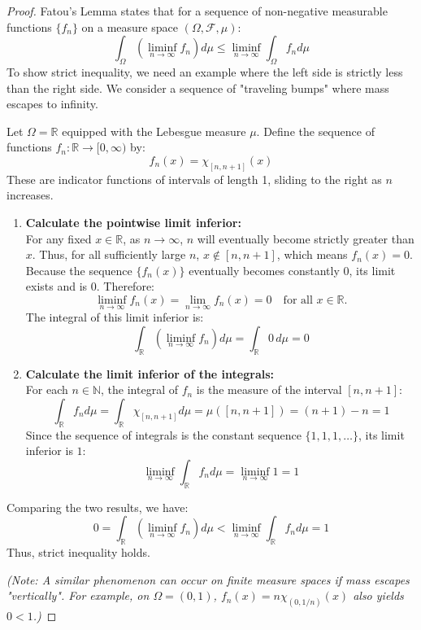 \documentclass[11pt]{article}
\begin{document}
\begin{proof}
Fatou's Lemma states that for a sequence of non-negative measurable functions $\{f_n\}$ on a measure space $(\Omega, \mathcal{F}, \mu)$:
\[ \int_\Omega \left( \liminf_{n \to \infty} f_n \right) d\mu \le \liminf_{n \to \infty} \int_\Omega f_n d\mu \]
To show strict inequality, we need an example where the left side is strictly less than the right side. We consider a sequence of "traveling bumps" where mass escapes to infinity.

Let $\Omega = \mathbb{R}$ equipped with the Lebesgue measure $\mu$. Define the sequence of functions $f_n: \mathbb{R} \to [0, \infty)$ by:
\[ f_n(x) = \chi_{[n, n+1]}(x) \]
These are indicator functions of intervals of length 1, sliding to the right as $n$ increases.

\begin{enumerate}
    \item \textbf{Calculate the pointwise limit inferior:} \\
    For any fixed $x \in \mathbb{R}$, as $n \to \infty$, $n$ will eventually become strictly greater than $x$. Thus, for all sufficiently large $n$, $x \notin [n, n+1]$, which means $f_n(x) = 0$.
    Because the sequence $\{f_n(x)\}$ eventually becomes constantly $0$, its limit exists and is $0$. Therefore:
    \[ \liminf_{n \to \infty} f_n(x) = \lim_{n \to \infty} f_n(x) = 0 \quad \text{for all } x \in \mathbb{R}. \]
    The integral of this limit inferior is:
    \[ \int_{\mathbb{R}} \left( \liminf_{n \to \infty} f_n \right) d\mu = \int_{\mathbb{R}} 0 \, d\mu = 0 \]

    \item \textbf{Calculate the limit inferior of the integrals:} \\
    For each $n \in \mathbb{N}$, the integral of $f_n$ is the measure of the interval $[n, n+1]$:
    \[ \int_{\mathbb{R}} f_n d\mu = \int_{\mathbb{R}} \chi_{[n, n+1]} d\mu = \mu([n, n+1]) = (n+1) - n = 1 \]
    Since the sequence of integrals is the constant sequence $\{1, 1, 1, \dots\}$, its limit inferior is $1$:
    \[ \liminf_{n \to \infty} \int_{\mathbb{R}} f_n d\mu = \liminf_{n \to \infty} 1 = 1 \]
\end{enumerate}

Comparing the two results, we have:
\[ 0 = \int_{\mathbb{R}} \left( \liminf_{n \to \infty} f_n \right) d\mu < \liminf_{n \to \infty} \int_{\mathbb{R}} f_n d\mu = 1 \]
Thus, strict inequality holds. 

\textit{(Note: A similar phenomenon can occur on finite measure spaces if mass escapes "vertically". For example, on $\Omega = (0, 1)$, $f_n(x) = n \chi_{(0, 1/n)}(x)$ also yields $0 < 1$.)}
\end{proof}
\end{document}
